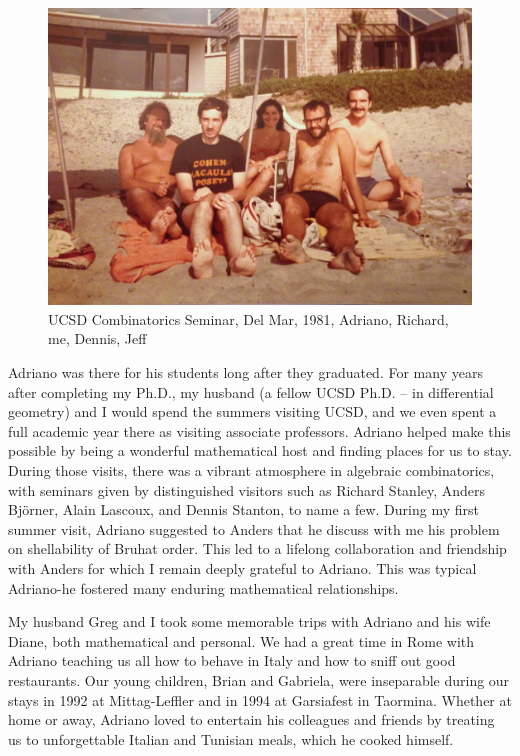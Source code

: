 \documentclass{notices}
\begin{document}
\begin{figure}
 \centering
    \includegraphics[width=0.95\linewidth]{Michelle_Wachs/IMG_2458.jpg} 
  {\footnotesize UCSD Combinatorics Seminar, Del Mar, 1981, Adriano, Richard, me, Dennis, Jeff}
\end{figure}
Adriano was there for his students long after they graduated.    For many years after completing my Ph.D., my husband (a fellow UCSD Ph.D. -- in differential geometry)  and I would
spend the summers visiting UCSD, and we even spent a full academic year there as visiting associate professors.   
Adriano helped make this possible by being a wonderful mathematical host and finding  places for us to stay.   
During those visits, there was a vibrant atmosphere in algebraic combinatorics, with seminars given
by distinguished visitors such as Richard Stanley, Anders Bj\"orner, Alain Lascoux, and Dennis Stanton, to name a few. 
 During my first summer visit, Adriano suggested to Anders that he discuss with me his problem  on shellability of Bruhat order.   This led to a lifelong collaboration and friendship with Anders for which I remain deeply grateful to Adriano. This was typical Adriano-he fostered many enduring mathematical relationships.

My husband Greg and I took some memorable trips with Adriano and his wife Diane, both mathematical and personal.  We had a great time in Rome with Adriano teaching us all how to behave in Italy and how to sniff out good restaurants. Our young children, Brian and Gabriela, were inseparable during our stays in 1992 at Mittag-Leffler and in 1994 at Garsiafest in Taormina. Whether at home or away,  Adriano loved to entertain his colleagues and friends by treating us to unforgettable Italian and Tunisian meals, which he cooked himself.
\end{document}
